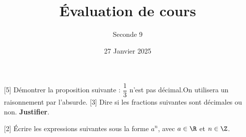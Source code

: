 \documentclass{exam}
\title{Évaluation de cours}
\date{27 Janvier 2025}
\author{Seconde 9}
\begin{document}
\maketitle

\begin{questions}
[5]
Démontrer la proposition suivante : \og $\dfrac{1}{3}$ n'est pas décimal.\fg On utilisera un raisonnement par l'absurde.
\vspace*{0.1cm}
\makeemptybox{8cm}
\vspace*{0.5cm}
[3]
Dire si les fractions suivantes sont décimales ou non. \textbf{Justifier}.
\vspace*{0.5cm}
[2]
Écrire les expressions suivantes sous la forme $a^n$, avec $a \in \R$ et $n \in \Z$.
\end{questions}
\end{document}
